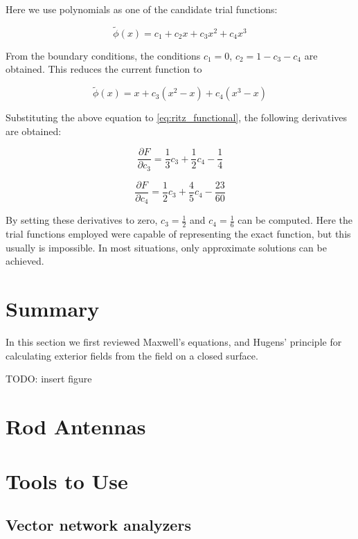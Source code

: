 \documentclass[a4paper,12pt]{report}
\begin{document}
Here we use polynomials as one of the candidate trial functions:

\begin{equation}
  \tilde{\phi}(x) = c_1 + c_2 x + c_3 x^2 + c_4 x^3
\end{equation}

From the boundary conditions,
the conditions $c_1 = 0$, $c_2 = 1 - c_3 - c_4$ are obtained.
This reduces the current function to

\begin{equation}
  \tilde{\phi}(x) = x + c_3 (x^2 - x) + c_4 (x^3 - x)
\end{equation}

Substituting the above equation to \ref{eq:ritz_functional},
the following derivatives are obtained:

\begin{equation}
  \frac{\partial F}{\partial c_3} = \frac{1}{3}c_3 + \frac{1}{2} c_4 - \frac{1}{4}
\end{equation}

\begin{equation}
  \frac{\partial F}{\partial c_4} = \frac{1}{2}c_3 + \frac{4}{5} c_4 - \frac{23}{60}
\end{equation}

By setting these derivatives to zero,
$c_3 = \frac{1}{2}$ and $c_4 = \frac{1}{6}$ can be computed.
Here the trial functions employed were capable of representing
the exact function, but this usually is impossible.
In most situations, only approximate solutions can be achieved.


\section{Summary}

In this section we first reviewed Maxwell's equations,
and Hugens' principle for calculating exterior fields from the field on a closed surface.

TODO: insert figure

\section{Rod Antennas}

\section{Tools to Use}

\subsection{Vector network analyzers}
\end{document}
